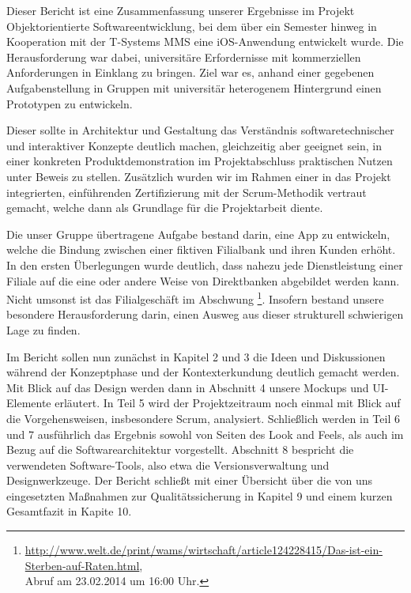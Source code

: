 	Dieser Bericht ist eine Zusammenfassung unserer Ergebnisse im Projekt Objektorientierte Softwareentwicklung, bei dem über ein Semester hinweg in Kooperation mit der T-Systems MMS eine iOS-Anwendung entwickelt wurde. Die Herausforderung war dabei, universitäre Erfordernisse mit kommerziellen Anforderungen in Einklang zu bringen. Ziel war es, anhand einer gegebenen Aufgabenstellung in Gruppen mit universitär heterogenem Hintergrund einen Prototypen zu entwickeln.
	
	Dieser sollte in Architektur und Gestaltung das Verständnis softwaretechnischer und interaktiver Konzepte deutlich machen, gleichzeitig aber geeignet sein, in einer konkreten Produktdemonstration im Projektabschluss praktischen Nutzen unter Beweis zu stellen. Zusätzlich wurden wir im Rahmen einer in das Projekt integrierten, einführenden Zertifizierung mit der Scrum-Methodik vertraut gemacht, welche dann als Grundlage für die Projektarbeit diente. 

	Die unser Gruppe übertragene Aufgabe bestand darin, eine App zu entwickeln, welche die Bindung zwischen einer fiktiven Filialbank und ihren Kunden erhöht. In den ersten Überlegungen wurde deutlich, dass nahezu jede Dienstleistung einer Filiale auf die eine oder andere Weise von Direktbanken abgebildet werden kann. Nicht umsonst ist das Filialgeschäft im Abschwung \footnote{\url{http://www.welt.de/print/wams/wirtschaft/article124228415/Das-ist-ein-Sterben-auf-Raten.html}, \\Abruf am 23.02.2014 um 16:00 Uhr.}. Insofern bestand unsere besondere Herausforderung darin, einen Ausweg aus dieser strukturell schwierigen Lage zu finden.
	
	Im Bericht sollen nun zunächst in Kapitel 2 und 3 die Ideen und Diskussionen während der Konzeptphase und der Kontexterkundung deutlich gemacht werden. Mit Blick auf das Design werden dann in Abschnitt 4 unsere Mockups und UI-Elemente erläutert. In Teil 5 wird der Projektzeitraum noch einmal mit Blick auf die Vorgehensweisen, insbesondere Scrum, analysiert. Schließlich werden in Teil 6 und 7 ausführlich das Ergebnis sowohl von Seiten des Look and Feels, als auch im Bezug auf die Softwarearchitektur vorgestellt. Abschnitt 8 bespricht die verwendeten Software-Tools, also etwa die Versionsverwaltung und Designwerkzeuge. Der Bericht schließt mit einer Übersicht über die von uns eingesetzten Maßnahmen zur Qualitätssicherung in Kapitel 9 und einem kurzen Gesamtfazit in Kapite 10.
	 